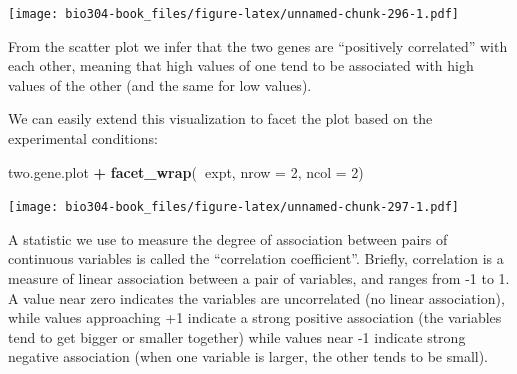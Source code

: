 \documentclass[]{book}
\newenvironment{Shaded}{\begin{snugshade}}{\end{snugshade}}
\newcommand{\CommentTok}[1]{\textcolor[rgb]{0.56,0.35,0.01}{\textit{#1}}}
\newcommand{\DataTypeTok}[1]{\textcolor[rgb]{0.13,0.29,0.53}{#1}}
\newcommand{\DecValTok}[1]{\textcolor[rgb]{0.00,0.00,0.81}{#1}}
\newcommand{\KeywordTok}[1]{\textcolor[rgb]{0.13,0.29,0.53}{\textbf{#1}}}
\newcommand{\NormalTok}[1]{#1}
\newcommand{\OperatorTok}[1]{\textcolor[rgb]{0.81,0.36,0.00}{\textbf{#1}}}
\newcommand{\StringTok}[1]{\textcolor[rgb]{0.31,0.60,0.02}{#1}}
\theoremstyle{definition}
\theoremstyle{definition}
\theoremstyle{definition}
\theoremstyle{remark}
\begin{document}
\begin{Shaded}
\end{Shaded}

\texttt{[image: bio304-book\_files/figure-latex/unnamed-chunk-296-1.pdf]}

From the scatter plot we infer that the two genes are ``positively
correlated'' with each other, meaning that high values of one tend to be
associated with high values of the other (and the same for low values).

We can easily extend this visualization to facet the plot based on the
experimental conditions:

\begin{Shaded}
\begin{Highlighting}[]
\NormalTok{two.gene.plot }\OperatorTok{+}\StringTok{ }\KeywordTok{facet_wrap}\NormalTok{(}\OperatorTok{~}\NormalTok{expt, }\DataTypeTok{nrow =} \DecValTok{2}\NormalTok{, }\DataTypeTok{ncol =} \DecValTok{2}\NormalTok{) }
\end{Highlighting}
\end{Shaded}

\texttt{[image: bio304-book\_files/figure-latex/unnamed-chunk-297-1.pdf]}

A statistic we use to measure the degree of association between pairs of
continuous variables is called the ``correlation coefficient''. Briefly,
correlation is a measure of linear association between a pair of
variables, and ranges from -1 to 1. A value near zero indicates the
variables are uncorrelated (no linear association), while values
approaching +1 indicate a strong positive association (the variables
tend to get bigger or smaller together) while values near -1 indicate
strong negative association (when one variable is larger, the other
tends to be small).
\end{document}

